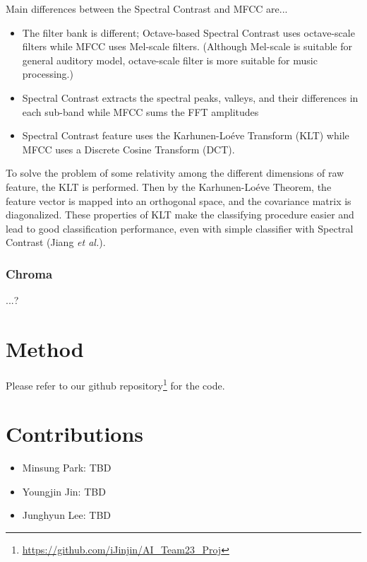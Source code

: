 \documentclass{article}
\theoremstyle{plain}
\theoremstyle{definition}
\theoremstyle{remark}
\begin{document}
Main differences between the Spectral Contrast and MFCC are...

\begin{itemize}
	\item The filter bank is different; Octave-based Spectral Contrast uses octave-scale filters while MFCC uses Mel-scale filters.
	(Although Mel-scale is suitable for general auditory model, octave-scale filter is more suitable for music processing.)
	
	\item Spectral Contrast extracts the spectral peaks, valleys, and their differences in each sub-band while MFCC sums the FFT amplitudes
	
	\item Spectral Contrast feature uses the Karhunen-Lo\'eve Transform (KLT) while MFCC uses a Discrete Cosine Transform (DCT).
\end{itemize}

To solve the problem of some relativity among the different dimensions of raw feature, the KLT is performed.
Then by the Karhunen-Lo\'eve Theorem, the feature vector is mapped into an orthogonal space, and the covariance matrix is diagonalized.
These properties of KLT make the classifying procedure easier and lead to good classification performance, even with simple classifier with Spectral Contrast (Jiang {\it et al.}).

\subsubsection{Chroma}
...?


\section{Method}

Please refer to our github repository\footnote{\url{https://github.com/iJinjin/AI_Team23_Proj}} for the code.

\section{Contributions}

\begin{itemize}
\item Minsung Park: TBD

\item Youngjin Jin: TBD

\item Junghyun Lee: TBD

\end{itemize}
\end{document}
